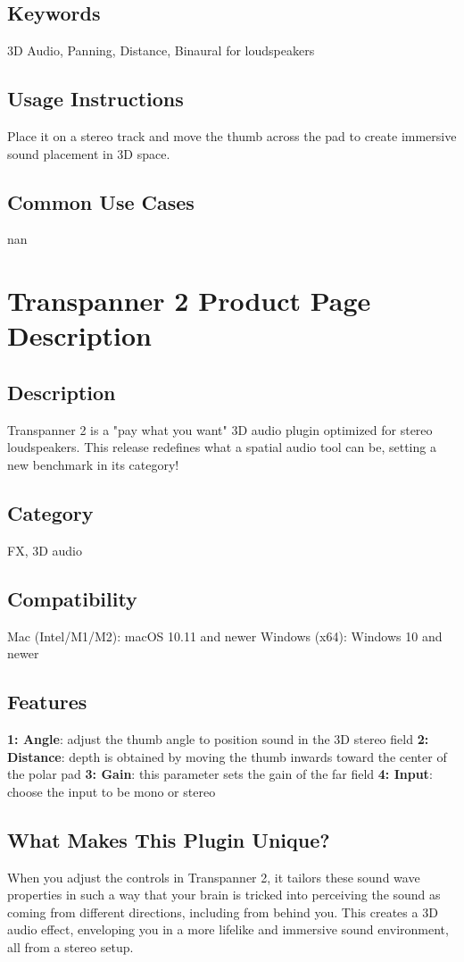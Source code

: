 \documentclass[8pt]{article}
\begin{document}
\subsection*{Keywords}
3D Audio, Panning, Distance, Binaural for loudspeakers

\subsection*{Usage Instructions}
Place it on a stereo track and move the thumb across the pad to create immersive sound placement in 3D space. 

\subsection*{Common Use Cases}
nan
\section*{Transpanner 2 Product Page Description}

\subsection*{Description}
Transpanner 2 is a "pay what you want" 3D audio plugin optimized for stereo loudspeakers. This release redefines what a spatial audio tool can be, setting a new benchmark in its category!

\subsection*{Category}
FX, 3D audio

\subsection*{Compatibility}
Mac (Intel/M1/M2): macOS 10.11 and newer
Windows (x64): Windows 10 and newer

\subsection*{Features}
\textbf{1: Angle}: adjust the thumb angle to position sound in the 3D stereo field
\textbf{2: Distance}: depth is obtained by moving the thumb inwards toward the center of the polar pad
\textbf{3: Gain}: this parameter sets the gain of the far field
\textbf{4: Input}: choose the input to be mono or stereo

\subsection*{What Makes This Plugin Unique?}
When you adjust the controls in Transpanner 2, it tailors these sound wave properties in such a way that your brain is tricked into perceiving the sound as coming from different directions, including from behind you. This creates a 3D audio effect, enveloping you in a more lifelike and immersive sound environment, all from a stereo setup.
\end{document}
